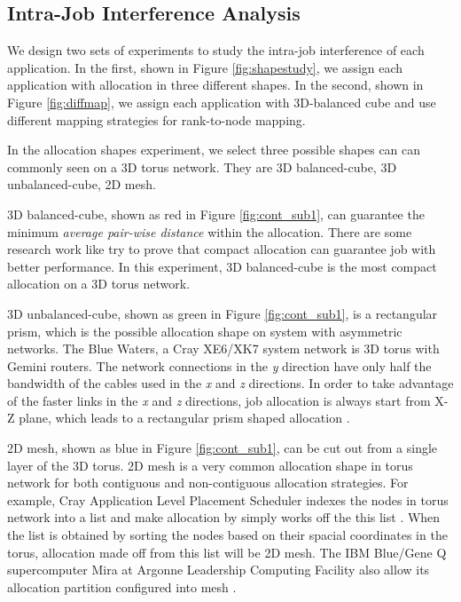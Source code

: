 \documentclass[conference]{IEEEtran}
\begin{document}
\subsection{Intra-Job Interference Analysis}
\label{sec: introjob}

We design two sets of experiments to study the intra-job interference of each application. In the first, shown in Figure \ref{fig:shapestudy}, we assign each application with allocation in three different shapes.  In the second, shown in Figure \ref{fig:diffmap}, we assign each application with 3D-balanced cube and use different mapping strategies for rank-to-node mapping. 

In the allocation shapes experiment, we select three possible shapes can can commonly seen on a 3D torus network. They are 3D balanced-cube, 3D unbalanced-cube, 2D mesh.

3D balanced-cube, shown as red in Figure \ref{fig:cont_sub1}, can guarantee the minimum \emph{average pair-wise distance} within the allocation. There are some research work like \cite{leung} \cite{abhinav-sc13} try to prove that compact allocation can guarantee job with better performance. In this experiment, 3D balanced-cube is the most compact allocation on a 3D torus network. 

3D unbalanced-cube, shown as green in Figure \ref{fig:cont_sub1}, is a rectangular prism, which is the possible allocation shape on system with asymmetric networks. The Blue Waters, a Cray XE6/XK7 system network is 3D torus with Gemini routers. The network connections in the \emph{y} direction have only half the bandwidth of the cables used in the \emph{x} and \emph{z} directions. In order to take advantage of the faster links in the \emph{x} and \emph{z} directions, job allocation is always start from X-Z plane, which leads to a rectangular prism shaped allocation \cite{RF}.

2D mesh, shown as blue in Figure \ref{fig:cont_sub1}, can be cut out from a single layer of the 3D torus. 2D mesh is a very common allocation shape in torus network for both contiguous and non-contiguous allocation strategies. For example, Cray Application Level Placement Scheduler indexes the nodes in torus network into a list and make allocation by simply works off the this list \cite{carl-cug}. When the list is obtained by sorting the nodes based on their spacial coordinates in the torus, allocation made off from this list will be 2D mesh. The IBM Blue/Gene Q supercomputer Mira at Argonne Leadership Computing Facility also allow its allocation partition configured into mesh \cite{zhou-ipdps}. 
\end{document}
